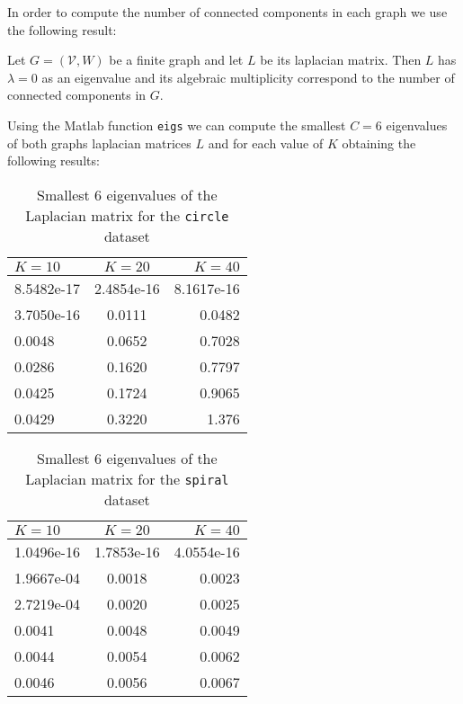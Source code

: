 In order to compute the number of connected components in each graph we use the following result:
\begin{thm}
    Let \(G = (\mathcal{V}, W)\) be a finite graph and let \(L\) be its laplacian matrix. Then \(L\) has \(\lambda = 0\) as an eigenvalue and its algebraic multiplicity correspond to the number of connected components in \(G\).
\end{thm}
\noindent Using the Matlab function \texttt{eigs} we can compute the smallest \(C = 6\) eigenvalues of both graphs laplacian matrices \(L\) and for each value of \(K\) obtaining the following results:

\begin{center}
    \begin{table}[h!]
        \centering
        \begin{tabular}{|l|c|r|}
            \hline
            $K=10$ & $K=20$ & $K=40$ \\
            \hline
            8.5482e-17 & 2.4854e-16 & 8.1617e-16\\ 
            \hline
            3.7050e-16 & 0.0111 & 0.0482\\
            \hline
            0.0048 & 0.0652 & 0.7028\\
            \hline
            0.0286 & 0.1620 & 0.7797\\
            \hline
            0.0425 & 0.1724 & 0.9065\\
            \hline
            0.0429 & 0.3220 & 1.376\\
            \hline
        \end{tabular}
        \caption{Smallest 6 eigenvalues of the Laplacian matrix for the \texttt{circle} dataset}    
        \label{table_circle_spiral}
    \end{table}
    \begin{table}[h!]
        \centering
        \begin{tabular}{|l|c|r|}
            \hline
            $K=10$ & $K=20$ & $K=40$ \\
            \hline
            1.0496e-16 & 1.7853e-16 & 4.0554e-16\\
            \hline
            1.9667e-04 & 0.0018 & 0.0023\\
            \hline
            2.7219e-04 & 0.0020 & 0.0025\\
            \hline
            0.0041 & 0.0048 & 0.0049\\
            \hline
            0.0044 & 0.0054 & 0.0062\\
            \hline
            0.0046 & 0.0056 & 0.0067\\
            \hline
        \end{tabular}
        \caption{Smallest 6 eigenvalues of the Laplacian matrix for the \texttt{spiral} dataset} 
        \label{table_eigs_spiral}   
    \end{table}
\end{center}
